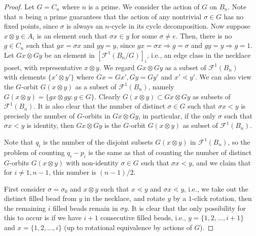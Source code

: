 \documentclass{amsart}
\theoremstyle{remark}
\newcommand{\so}{\Rightarrow}
\begin{document}
\begin{proof} 
Let $G = C_n$ where $n$ is a prime. We consider the action of $G$ on $B_n$. 
 Note that $n$ being a prime guarantees that the action of any nontrivial $\sigma \in G$ has no fixed points, since $\sigma$ is always an $n$-cycle in its cycle decomposition. Now suppose $x\otimes y \in A_i$  is an element such that $\sigma x \in y$ for some $\sigma \neq e$. Then, there is no $g \in C_n$ such that $gx = \sigma x$ and $g y = y$, since $gx = \sigma x \so g = \sigma $ and $g y = y \so g = 1$. Let $Gx\otimes Gy$  be an element in $[\mathcal F^1(B_n/G)]_i$, i.e., an edge class in the necklace poset, with representative $x\otimes y$. We regard $Gx \otimes Gy$ as a subset of $\mathcal F^1 (B_n)$ with elements $\{x' \otimes y'\}$  where $Gx = Gx', Gy = Gy'$ and $x' \lessdot y'$. We can also view the $G$-orbit $G(x \otimes y)$ as a subset of $\mathcal F^1 (B_n)$, namely $G(x \otimes y) = \{gx \otimes g y : g \in G \}$. Clearly $G(x \otimes y) \subset Gx \otimes Gy$ as subsets of $\mathcal F^1 (B_n)$. It is also clear that the number of distinct $\sigma \in G$ such that $\sigma x < y$ is precisely the number of $G$-orbits in $Gx\otimes Gy$,  in particular, if the only $\sigma $ such that $\sigma x < y$ is identity, then $Gx \otimes Gy$ is the $G$-orbit $G(x \otimes y)$ as subset of $\mathcal F^1 (B_n)$. 

Note that $q_i$ is the number of the disjoint subsets $G(x \otimes y)$ in $\mathcal F^1 (B_n)$, so the problem of counting $q_i - p_i$ is the same as that of counting the number of distinct $G$-orbits $G(x \otimes y)$  with non-identity $\sigma \in G$ such that $\sigma x < y$, and we claim that for $i\neq 1,n-1$, this number is $(n-1)/2$.  


First consider $\sigma = \sigma_0$ and $x \otimes y $ such that $x \lessdot y$ and $\sigma x \lessdot y$, i.e., we take out the distinct filled bead from $y$ in the necklace, and rotate $y$ by a $1$-click rotation, then the remaining $i$ filled beads remain in $\sigma y$. It is clear that the only possibility for this to occur is if we have $i+1$ consecutive filled beads, i.e., $y = \{1, 2, ..., i+1\}$ and $x = \{1, 2, ..., i \}$ (up to rotational equivalence by actions of $G$). 



\end{proof}
\end{document}
